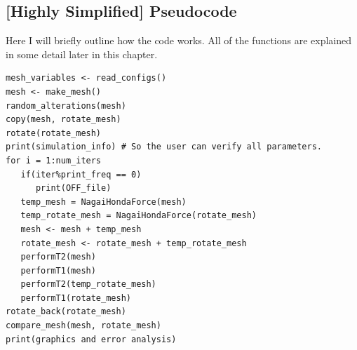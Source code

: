 \subsection{[Highly Simplified] Pseudocode}
Here I will briefly outline how the code works. All of the functions are explained in some detail later in this chapter.
\begin{lstlisting}
mesh_variables <- read_configs()
mesh <- make_mesh()
random_alterations(mesh)
copy(mesh, rotate_mesh)
rotate(rotate_mesh)
print(simulation_info) # So the user can verify all parameters.
for i = 1:num_iters
   if(iter%print_freq == 0)
      print(OFF_file)
   temp_mesh = NagaiHondaForce(mesh) 
   temp_rotate_mesh = NagaiHondaForce(rotate_mesh)
   mesh <- mesh + temp_mesh
   rotate_mesh <- rotate_mesh + temp_rotate_mesh
   performT2(mesh)
   performT1(mesh)
   performT2(temp_rotate_mesh)
   performT1(rotate_mesh)
rotate_back(rotate_mesh)
compare_mesh(mesh, rotate_mesh)
print(graphics and error analysis)
\end{lstlisting}

